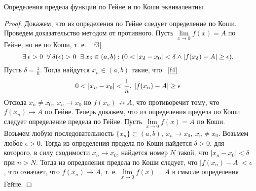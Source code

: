 \begin{theorem}
Определения предела функции по Гейне и по Коши эквивалентны.
\end {theorem} 
\begin {proof}
Докажем, что из определения по
Гейне следует определение по Коши. Проведем доказательство методом от противного.
\newline Пусть $\lim\limits_{x\to 0} f(x)=A$ по Гейне, но не по Коши, т. е. ~\eqref{f3}
\newline
\begin{equation}
\label{f3}
\centering
\exists \: \epsilon >0 \; \; \forall \: \delta (\epsilon) >0 \; \; \exists \: x_\delta \in (a, b) : (0<|x_\delta-x_0|<\delta \land |f(x_\delta)-A|\geq \epsilon).
\end{equation}
\newline
Пусть $\delta = \frac{1}{n}$. Тогда найдутся $x_n \in (a, b)$ такие, что ~\eqref{f4}
\newline
\begin{equation}
\label{f4}
\centering
0<|x_n-x_0|<\frac{1}{n}, \: |f(x_n)-A|\geq \epsilon
\end{equation}
\newline
Отсюда $x_n \neq x_0, \; x_n \rightarrow x_0$ но $f(x_n) \nrightarrow A$, что противоречит тому, что $f(x_n) \rightarrow A$ по Гейне.
\newline \indent Теперь докажем, что из определения предела по Коши
следует определение предела по Гейне.
\newline \indent \vspace{2mm} Пусть $\lim\limits_{x\to 0} f(x)=A$ по Коши. Возьмем любую последовательность $\{x_n\} \subset (a, b), \: x_n \rightarrow x_0, \: x_n \neq x_0$. Возьмем любое $\epsilon > 0$. Тогда из определения предела по Коши найдется $\delta > 0$, для которого, в силу сходимости $x_n \rightarrow x_0$, найдется номер $N$ такой, что $|x_n-x_0| < \delta$ при $n > N$. Тогда из
определения предела по Коши следует, что $|f(x_n)-A| < \epsilon$,
что означает, что $f(x_n) \rightarrow A$, т. е. $\lim\limits_{x\to 0} f(x)=A$ в смысле определения Гейне.
\end {proof}

